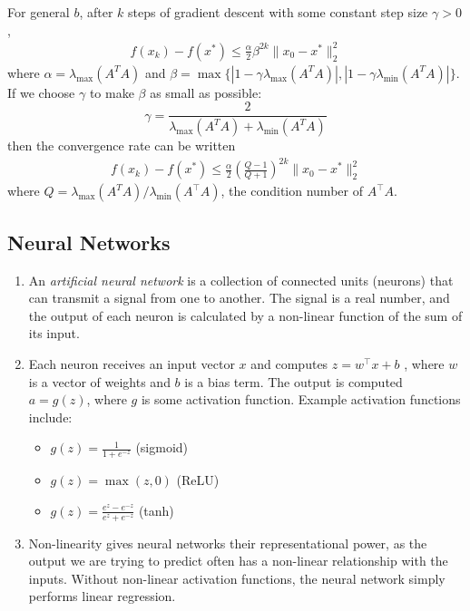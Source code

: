 \documentclass[10pt]{article}
\begin{document}
\begin{multicols}{2}
\begin{addmargin}[0.8em]{0.5em}
\begin{enumerate}[label=(\alph*)]
        For general $b$, after $k$ steps of gradient descent with some constant step size $\gamma > 0$,
        \begin{align*}
        f(x_k) - f(x^*) \leq \frac{\alpha}{2} \beta^{2k} \|x_0-x^*\|_2^2
        \end{align*}
        where $\alpha = \lambda_{\max}(A^TA)$ and $\beta = \max \{ | 1 - \gamma \lambda_{\max}(A^TA) |, | 1 - \gamma \lambda_{\min}(A^TA) | \}$. If we choose $\gamma$ to make $\beta$ as small as possible:
        $$\gamma = \frac{2}{\lambda_{\max}(A^TA) + \lambda_{\min}(A^TA)} $$
        then the convergence rate can be written
        \begin{align*}
        f(x_k) - f(x^*) \leq \frac{\alpha}{2} \left( \frac{Q-1}{Q+1} \right)^{2k} \|x_0-x^*\|_2^2
        \end{align*}
        where $Q = \lambda_{\max}(A^TA) / \lambda_{\min}(A^\top A)$, the condition number of $A^\top A$.
    \end{enumerate}
    
    \subsection{Neural Networks}
    \begin{enumerate}[label=(\alph*)]
        \item An \textit{artificial neural network} is a collection of connected units (neurons) that can transmit a signal from one to another. The signal is a real number, and the output of each neuron is calculated by a non-linear function of the sum of its input. 
        
        \item Each neuron receives an input vector $x$ and computes $z = w^\top x + b$ , where $w$ is a vector of weights and $b$ is a bias term. The output is computed $a=g(z)$, where $g$ is some activation function. Example activation functions include:
        \begin{itemize}
        \item $g(z) = \frac{1}{1 + e^{-z}}$ (sigmoid)
        \item $g(z) = \max(z,0)$ (ReLU)
        \item $g(z) = \frac{e^z - e^{-z}}{e^z + e^{-z}}$ (tanh)
        \end{itemize}
        
        \item Non-linearity gives neural networks their representational power, as the output we are trying to predict often has a non-linear relationship with the inputs. Without non-linear activation functions, the neural network simply performs linear regression.        
        

\end{enumerate}
\end{addmargin}
\end{multicols}
\end{document}
